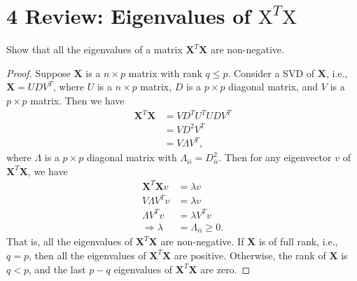 \documentclass[10pt]{article}
\begin{document}
\section*{4 Review: Eigenvalues of $\mathrm{X}^{T} \mathrm{X}$}
Show that all the eigenvalues of a matrix $\mathbf{X}^{T} \mathbf{X}$ are non-negative.
\begin{proof}

    Suppose $\mathbf{X}$ is a $n\times p$ matrix with rank $q\leq p$. Consider a SVD of $\mathbf{X}$, i.e., $\mathbf{X} = UDV^{T}$, where $U$ is a $n\times p$ matrix, $D$ is a $p\times p$ diagonal matrix, and $V$ is a $p\times p$ matrix. Then we have
    \begin{align*}
        \mathbf{X}^{T} \mathbf{X} &= VD^{T}U^{T}UDV^{T}\\
        &= VD^{2}V^{T}\\
        &= V\Lambda V^{T},
    \end{align*}
    where $\Lambda$ is a $p\times p$ diagonal matrix with $\Lambda_{ii} = D_{ii}^{2}$. Then for any eigenvector $v$ of $\mathbf{X}^{T} \mathbf{X}$, we have
    \begin{align*}
        \mathbf{X}^{T} \mathbf{X} v &= \lambda v\\
        V\Lambda V^{T}v &= \lambda v\\
        \Lambda V^{T}v &= \lambda V^{T}v\\
        \Rightarrow \lambda &= \Lambda_{ii} \geq 0.
    \end{align*}
    That is, all the eigenvalues of $\mathbf{X}^{T} \mathbf{X}$ are non-negative. If $\mathbf{X}$ is of full rank, i.e., $q = p$, then all the eigenvalues of $\mathbf{X}^{T} \mathbf{X}$ are positive. Otherwise, the rank of $\mathbf{X}$ is $q < p$, and the last $p-q$ eigenvalues of $\mathbf{X}^{T} \mathbf{X}$ are zero. 

\end{proof}
\end{document}
